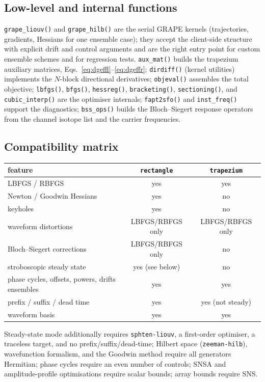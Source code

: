\documentclass[11pt,a4paper]{article}
\newcommand{\code}[1]{\texttt{#1}}
\begin{document}
\subsection{Low-level and internal functions}

\code{grape\_liouv()} and \code{grape\_hilb()} are the serial GRAPE
kernels (trajectories, gradients, Hessians for one ensemble case); they
accept the client-side structure with explicit drift and control
arguments and are the right entry point for custom ensemble schemes and
for regression tests. \code{aux\_mat()} builds the trapezium auxiliary
matrices, Eqs.~\eqref{eq:dgeffl}--\eqref{eq:dgeffr}; \code{dirdiff()}
(kernel utilities) implements the $N$-block directional derivatives;
\code{objeval()} assembles the total objective; \code{lbfgs()},
\code{bfgs()}, \code{hessreg()}, \code{bracketing()},
\code{sectioning()}, and \code{cubic\_interp()} are the optimiser
internals; \code{fapt2sfo()} and \code{inst\_freq()} support the
diagnostics; \code{bss\_ops()} builds the Bloch--Siegert response
operators from the channel isotope list and the carrier frequencies.

\subsection{Compatibility matrix}

\begin{center}
\begin{tabular}{lcc}
\toprule
feature & \code{rectangle} & \code{trapezium}\\
\midrule
LBFGS / RBFGS            & yes & yes\\
Newton / Goodwin Hessians & yes & no\\
keyholes                 & yes & no\\
waveform distortions     & LBFGS/RBFGS only & LBFGS/RBFGS only\\
Bloch--Siegert corrections & LBFGS/RBFGS only & no\\
stroboscopic steady state & yes (see below) & no\\
phase cycles, offsets, powers, drifts ensembles & yes & yes\\
prefix / suffix / dead time & yes & yes (not steady)\\
waveform basis            & yes & yes\\
\bottomrule
\end{tabular}
\end{center}

Steady-state mode additionally requires \code{sphten-liouv}, a
first-order optimiser, a traceless target, and no
prefix/suffix/dead-time; Hilbert space (\code{zeeman-hilb}),
wavefunction formalism, and the Goodwin method require all generators
Hermitian; phase cycles require an even number of controls; SNSA and
amplitude-profile optimisations require scalar bounds; array bounds
require SNS.
\end{document}
